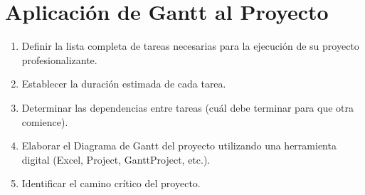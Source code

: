 \documentclass[../main]{subfiles}
\begin{document}
\chapter{Aplicación de Gantt al Proyecto}
\begin{enumerate}
  \item Definir la lista completa de tareas necesarias para la ejecución de su proyecto profesionalizante.
  \item Establecer la duración estimada de cada tarea.
  \item Determinar las dependencias entre tareas (cuál debe terminar para que otra comience).
  \item Elaborar el Diagrama de Gantt del proyecto utilizando una herramienta digital (Excel, Project, GanttProject, etc.).
  \item Identificar el camino crítico del proyecto.
\end{enumerate}
\end{document}
